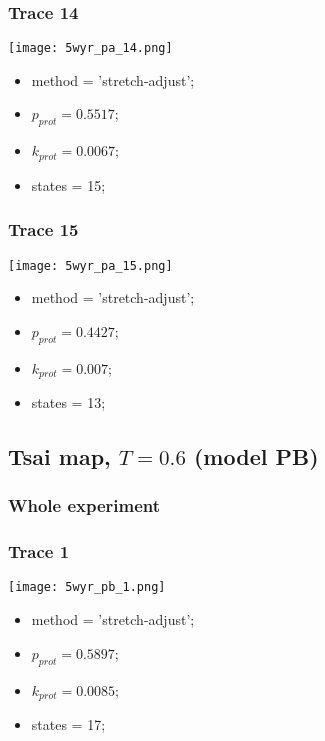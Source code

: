 \subsubsection{Trace 14}
\begin{minipage}[c]{0.7\textwidth}
    \texttt{[image: 5wyr\_pa\_14.png]}
\end{minipage}
\hfill
\begin{minipage}[c]{0.45\textwidth}
    \begin{itemize}
        \item method = 'stretch-adjust';
        \item $p_{prot}=0.5517$;
        \item $k_{prot}=0.0067$;
        \item states = 15;
    \end{itemize}
\end{minipage}

\subsubsection{Trace 15}
\begin{minipage}[c]{0.7\textwidth}
    \texttt{[image: 5wyr\_pa\_15.png]}
\end{minipage}
\hfill
\begin{minipage}[c]{0.45\textwidth}
    \begin{itemize}
        \item method = 'stretch-adjust';
        \item $p_{prot}=0.4427$;
        \item $k_{prot}=0.007$;
        \item states = 13;
    \end{itemize}
\end{minipage}

\subsection{Tsai map, $T=0.6$ (model PB)}
\subsubsection{Whole experiment}

\subsubsection{Trace 1}
\begin{minipage}[c]{0.7\textwidth}
    \texttt{[image: 5wyr\_pb\_1.png]}
\end{minipage}
\hfill
\begin{minipage}[c]{0.45\textwidth}
    \begin{itemize}
        \item method = 'stretch-adjust';
        \item $p_{prot}=0.5897$;
        \item $k_{prot}=0.0085$;
        \item states = 17;
    \end{itemize}
\end{minipage}

